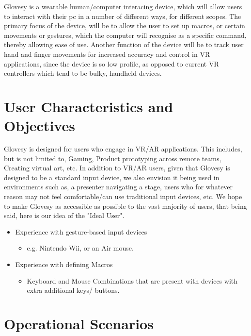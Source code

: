 \documentclass[12pt,a4paper,oneside]{book}
\theoremstyle{plain}
\numberwithin{equation}{chapter}
\begin{document}
\noindent Glovesy is a wearable human/computer interacing device, which will allow users to interact with their pc in a number of different ways, for different scopes.  The primary focus of the device, will be to allow the user to set up macros, or certain movements or gestures, which the computer will recognise as a specific command, thereby allowing ease of use. Another function of the device will be to track user hand and finger movements for increased accuracy and control in VR applications, since the device is so low profile, as opposed to current VR controllers which tend to be bulky, handheld devices.

\section{User Characteristics and Objectives}

\noindent Glovesy is designed for users who engage in VR/AR applications. This includes, but is not limited to, Gaming, Product prototyping across remote teams,  Creating virtual art, etc. In addition to VR/AR users, given that Glovesy is designed to be a standard input device, we also envision it being used in environments such as,  a presenter navigating a stage, users who for whatever reason may not feel comfortable/can use traditional input devices, etc. We hope to make Glovesy as accessible as possible to the vast majority of users, that being said, here is our idea of the "Ideal User".

\begin{itemize}
    \item Experience with gesture-based input devices
    \begin{itemize}
        \item e.g. Nintendo Wii, or an Air mouse.
    \end{itemize}
    \item Experience with defining Macros
    \begin{itemize}
        \item Keyboard and Mouse Combinations that are present with devices with extra additional keys/ buttons.
    \end{itemize}
\end{itemize}

\section{Operational Scenarios}
\end{document}

